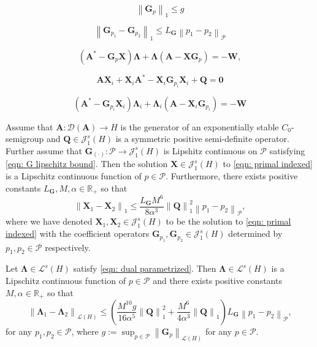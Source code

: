 \documentclass[10pt,a4paper]{amsart}
\newcommand{\bA}{\mathbf A}
\newcommand{\bG}{\mathbf G}
\newcommand{\bLambda}{\boldsymbol{\Lambda}}
\newcommand{\bQ}{\mathbf Q}
\newcommand{\bW}{\mathbf W}
\newcommand{\bX}{\mathbf X}
\newcommand{\norm}[1]{\left\| #1 \right\|}
\newcommand{\p}[1]{\left( {#1} \right)}
\newcommand{\sJ}{\mathscr J}
\newcommand{\sL}{\mathscr L}
\newcommand{\sP}{\mathcal{P}}
\begin{document}
\begin{equation} \label{eqn: G bound}
    \norm{\bG_p}_1 \leq g
\end{equation}

\begin{equation} \label{eqn: G lipschitz bound}
    \norm{\bG_{p_1} - \bG_{p_2}}_{1} \leq L_{\bG} 
    \norm{p_1 - p_2}_{\sP}
\end{equation}

    \begin{equation} \label{eqn: dual parametrized}
        \p{\bA^*-\bG_p\bX}\bLambda + \bLambda\p{\bA-\bX\bG_p} = -\bW,
    \end{equation}

\begin{equation} \label{eqn: primal indexed}
    \bA\bX_i + \bX_i\bA^* - \bX_i\bG_{p_i}\bX_i + \bQ = \mathbf 0
\end{equation}

\begin{equation} \label{eqn: dual indexed}
    \p{\bA^* - \bG_{p_i}\bX_i}\bLambda_i
    + 
    \bLambda_i\p{\bA-\bX_i\bG_{p_i}} = -\bW
\end{equation}

\begin{lemma} \label{lemma: continuity wrt G}
    Assume that $\bA: \mathcal D(\bA) \rightarrow H$ is the generator of an exponentially stable $C_0$-semigroup and $\bQ \in \sJ_1^s(H)$ is a symmetric positive semi-definite operator. Further assume that $\bG_{\p{\cdot}} : \sP \rightarrow \sJ_1^s(H)$ is Lipshitz continuous on $\sP$ satisfying \eqref{eqn: G lipschitz bound}. Then the solution $\bX\in \sJ_1^s(H)$ to \eqref{eqn: primal indexed} is a Lipschitz continuous function of $p\in \sP$. Furthermore, there exists positive constants $L_{\bG}, M,\alpha \in \mathbb R_+$ so that
    $$
        \norm{\bX_1 - \bX_2}_{1} \leq \frac{L_{\bG}M^6}{8\alpha^3} \norm{\bQ}^2_{1} \norm{p_1 - p_2}_{\sP},
    $$
    where we have denoted $\bX_1, \bX_2 \in \sJ_1^s(H)$ to be the solution to \eqref{eqn: primal indexed} with the coefficient operators $\bG_{p_1}, \bG_{p_2} \in \sJ_1^s(H)$ determined by $p_1, p_2 \in \sP$ respectively.
\end{lemma}

\begin{lemma} \label{lemma: Lambda Difference bound}
    Let $\bLambda \in \sL^s(H)$ satisfy \eqref{eqn: dual parametrized}. Then $\bLambda \in \sL^s(H)$ is a Lipschitz continuous function of $p \in \sP$ and there exists positive constants $M, \alpha \in \mathbb R_+$ so that
    $$
        \norm{\bLambda_{1} - \bLambda_{2}}_{\sL\p{H}} \leq \p{\frac{M^{10}g}{16\alpha^5}\norm{\bQ}^2_1 
        + \frac{M^6}{4\alpha^3}\norm{\bQ}_1 }L_{\bG} \norm{p_1 - p_2}_{\sP},
    $$
    for any $p_1, p_2 \in \sP$, where $g := \sup_{p\in\sP}\norm{\bG_p}_{\sL(H)}$ for any $p \in \sP$.
\end{lemma}
\end{document}
